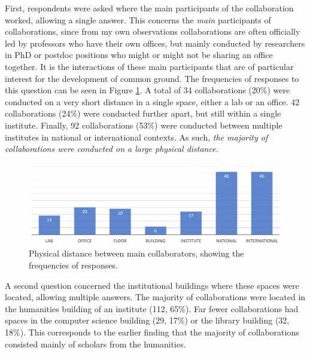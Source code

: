 \documentclass{article}
\begin{document}
First, respondents were asked where the main participants of the collaboration worked, allowing a single answer.  This concerns the \textit{main} participants of collaborations, since from my own observations collaborations are often officially led by professors who have their own offices, but mainly conducted by researchers in PhD or postdoc positions who might or might not be sharing an office together. It is the interactions of these main participants that are of particular interest for the development of common ground.
The frequencies of responses to this question can be seen in Figure \ref{fig:bardistance}. A total of 34 collaborations (20\%) were conducted on a very short distance in a single space, either a lab or an office. 42 collaborations (24\%) were conducted further apart, but still within a single institute. Finally, 92 collaborations (53\%) were conducted between multiple institutes in national or international contexts. As such, \textit{the majority of collaborations were conducted on a large physical distance}.

\begin{figure}  
\begin{center}  
\includegraphics[width=1.0\linewidth]{bardistance.png}  
\caption{Physical distance between main collaborators, showing the frequencies of responses.\label{fig:bardistance}}  
\end{center}  
\end{figure}

A second question concerned the institutional buildings where these spaces were located, allowing multiple answers. The majority of collaborations were located in the humanities building of an institute (112, 65\%). Far fewer collaborations had spaces in the computer science building (29, 17\%) or the library building (32, 18\%). This corresponds to the earlier finding that the majority of collaborations consisted mainly of scholars from the humanities.
\end{document}
